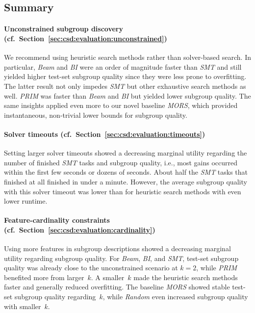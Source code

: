 \documentclass{article}
\theoremstyle{definition}
\begin{document}
\subsection{Summary}
\label{sec:csd:evaluation:summary}

\paragraph{Unconstrained subgroup discovery (cf.~Section~\ref{sec:csd:evaluation:unconstrained})}

We recommend using heuristic search methods rather than solver-based search.
In particular, \emph{Beam} and \emph{BI} were an order of magnitude faster than \emph{SMT} and still yielded higher test-set subgroup quality since they were less prone to overfitting.
The latter result not only impedes \emph{SMT} but other exhaustive search methods as well.
\emph{PRIM} was faster than \emph{Beam} and \emph{BI} but yielded lower subgroup quality.
The same insights applied even more to our novel baseline \emph{MORS}, which provided instantaneous, non-trivial lower bounds for subgroup quality.

\paragraph{Solver timeouts (cf.~Section~\ref{sec:csd:evaluation:timeouts})}

Setting larger solver timeouts showed a decreasing marginal utility regarding the number of finished \emph{SMT} tasks and subgroup quality, i.e., most gains occurred within the first few seconds or dozens of seconds.
About half the \emph{SMT} tasks that finished at all finished in under a minute.
However, the average subgroup quality with this solver timeout was lower than for heuristic search methods with even lower runtime.

\paragraph{Feature-cardinality constraints (cf.~Section~\ref{sec:csd:evaluation:cardinality})}

Using more features in subgroup descriptions showed a decreasing marginal utility regarding subgroup quality.
For \emph{Beam}, \emph{BI}, and \emph{SMT}, test-set subgroup quality was already close to the unconstrained scenario at $k=2$, while \emph{PRIM} benefited more from larger~$k$.
A smaller~$k$ made the heuristic search methods faster and generally reduced overfitting.
The baseline \emph{MORS} showed stable test-set subgroup quality regarding~$k$, while \emph{Random} even increased subgroup quality with smaller~$k$.
\end{document}
